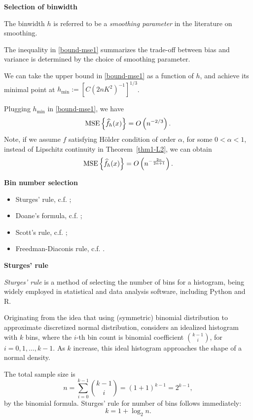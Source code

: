 \documentclass[19pt,landscaoe]{article}
\begin{document}
\newpage
{\LARGE\centerline{\textbf{Selection of binwidth}}}
\vskip25pt
\begin{minipage}{.9\textwidth}
    \Large The binwidth $h$ is referred to be a {\it smoothing parameter} in the literature on smoothing. 

    The inequality in \eqref{bound-mse1} summarizes the trade-off between bias and variance is determined by the choice of smoothing parameter. 

    We can take the upper bound in \eqref{bound-mse1} as a function of $h$, and achieve its minimal point at $h_{\min}:=[C(2nK^2)^{-1}]^{1/3}$. 
    
    Plugging $h_{\min}$ in \eqref{bound-mse1}, we have
    $${\rm MSE}\left\{\widehat{f}_h(x)\right\}=O\left(n^{-2/3}\right).$$
    Note, if we assume $f$ satisfying H\"older condition of order $\alpha$, for some $0<\alpha<1$, instead of Lipschitz continuity in Theorem~\ref{thm1-L2}, we can obtain 
    $${\rm MSE}\left\{\widehat{f}_h(x)\right\}=O\left(n^{-\frac{2\alpha}{2\alpha+1}}\right).$$
\end{minipage}

\newpage
{\LARGE\centerline{\textbf{Bin number selection}}}
\vskip25pt
\begin{minipage}{.9\textwidth}
    \Large 
\begin{itemize}
    \item Sturges' rule, c.f. \cite{sturges26};
    \item Doane's formula, c.f. \cite{doane76};
    \item Scott's rule, c.f. \cite{scott79};
    \item Freedman-Diaconis rule, c.f. \cite{FreedmanDiaconis81}. 
\end{itemize}
\end{minipage}

\newpage
{\LARGE{\textbf{Sturges' rule}}}
\vskip25pt
\begin{minipage}{.9\textwidth}
    \Large 
{\it Sturges' rule} is a method of selecting the number of bins for a histogram, being widely employed in statistical and data analysis software, including Python and R. 

Originating from the idea that using (symmetric) binomial distribution to approximate discretized normal distribution, \cite{sturges26} considers an idealized histogram with $k$ bins, where the $i$-th bin count is binomial coefficient ${k-1 \choose i}$, for $i=0,1,\dots,k-1$. As $k$ increase, this ideal histogram approaches the shape of a normal density. 

The total sample size is 
$$n=\sum_{i=0}^{k-1}{k-1 \choose i}=(1+1)^{k-1}=2^{k-1},$$
by the binomial formula. Sturges' rule for number of bins follows immediately:
\begin{equation}\label{sturges-rule}
    k=1+\log_2n.
\end{equation}
\end{minipage}
\end{document}
